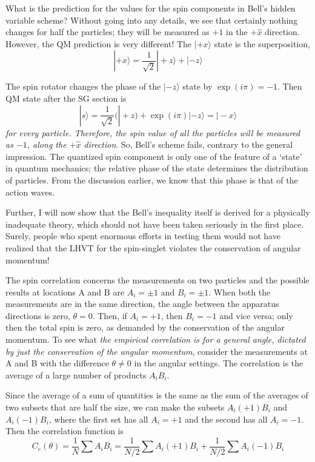 What is the prediction for the values for the spin components in Bell's hidden variable
scheme? Without going into any details, we see that certainly nothing changes for half the
particles; they will be measured as $+1$ in the $+ \hat{x}$ direction. However, the QM prediction is
very different! The $|+x \rangle$ state is the superposition,
\begin{equation*}
| + x \rangle = \frac{1}{\sqrt{2}} | + z\rangle + | - z \rangle \tag{39}\label{c14-eq39}
\end{equation*}

The spin rotator changes the phase of the $|-z \rangle$ state by $\exp(i \pi) = -1$. Then QM state after 
the SG section is
\begin{equation*}
|s \rangle = \frac{1}{\sqrt{2}} (|+z) + \exp (i \pi) | - z \rangle = | - x \rangle \tag{40}\label{c14-eq40}
\end{equation*}
\textit{for every particle. Therefore, the spin value of all the particles will be measured as $-1$, along
the $+ \hat{x}$ direction}. So, Bell's scheme fails, contrary to the general impression. The quantized
spin component is only one of the feature of a `state' in quantum mechanics; the relative phase of
the state determines the distribution of particles. From the discussion earlier, we know that
this phase is that of the action waves.

Further, I will now show that the Bell's inequality itself is derived for a physically inadequate theory, which should not have been taken seriously in the first place. Surely, people who spent enormous efforts in testing them would not have realized that the LHVT for the
spin-singlet violates the conservation of angular momentum!

The spin correlation concerns the measurements on two particles and the possible results
at locations A and B are $A_i = \pm 1$ and $B_i = \pm 1$. When both the measurements are in the
same direction, the angle between the apparatus directions is zero, $\theta = 0$. Then, if $A_i = +1$, then
$B_i = -1$ and vice versa; only then the total spin is zero, as demanded by the conservation
of the angular momentum. To see what \textit{the empirical correlation is for a general angle,
dictated by just the conservation of the angular momentum}, consider the measurements at
A and B with the difference $\theta \neq 0$ in the angular settings. The correlation is the average of
a large number of products $A_i B_i$.

Since the average of a sum of quantities is the same as the sum of the averages of two
subsets that are half the size, we can make the subsets $A_i (+1)B_i$ and $A_i (-1)B_i$, where the
first set has all $A_i = +1$ and the second has all $A_i = -1$. Then the correlation function is
\begin{equation*}
C_e (\theta) = \frac{1}{N} \sum A_i B_i = \frac{1}{N/2} \sum A_i (+1) B_i + \frac{1}{N/2} \sum A_i (-1) B_i\tag{41}\label{c14-eq41}
\end{equation*}

